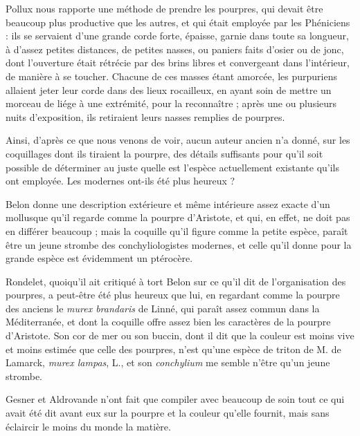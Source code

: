 \documentclass[a4paper, 11pt, oneside, polutonikogreek, french]{article}
\begin{document}
Pollux nous rapporte une méthode de prendre les pourpres, qui devait être beaucoup plus productive que les autres, et qui était employée par les Phéniciens : ils se servaient d'une grande corde forte, épaisse, garnie dans toute sa longueur, à d'assez petites distances, de petites nasses, ou paniers faits d'osier ou de jonc, dont l'ouverture était rétrécie par des brins libres et convergeant dans l'intérieur, de manière à se toucher. Chacune de ces masses étant amorcée, les purpuriens allaient jeter leur corde dans des lieux rocailleux, en ayant soin de mettre un morceau de liége à une extrémité, pour la reconnaître ; après une ou plusieurs nuits d'exposition, ils retiraient leurs nasses remplies de pourpres.

Ainsi, d'après ce que nous venons de voir, aucun auteur ancien n'a donné, sur les coquillages dont ils tiraient la pourpre, des détails suffisants pour qu'il soit possible de déterminer au juste quelle est l'espèce actuellement existante qu'ils ont employée. Les modernes ont-ils été plus heureux ?

Belon donne une description extérieure et même intérieure assez exacte d'un mollusque qu'il regarde comme la pourpre d'Aristote, et qui, en effet, ne doit pas en différer beaucoup ; mais la coquille qu'il figure comme la petite espèce, paraît être un jeune strombe des conchyliologistes modernes, et celle qu'il donne pour la grande espèce est évidemment un ptérocère.

Rondelet, quoiqu'il ait critiqué à tort Belon sur ce qu'il dit de l'organisation des pourpres, a peut-être été plus heureux que lui, en regardant comme la pourpre des anciens le \emph{murex brandaris} de Linné, qui paraît assez commun dans la Méditerranée, et dont la coquille offre assez bien les caractères de la pourpre d'Aristote. Son cor de mer ou son buccin, dont il dit que la couleur est moins vive et moins estimée que celle des pourpres, n'est qu'une espèce de triton de M. de Lamarck, \emph{murex lampas}, L., et son \emph{conchylium} me semble n'être qu'un jeune strombe.

Gesner et Aldrovande n'ont fait que compiler avec beaucoup de soin tout ce qui avait été dit avant eux sur la pourpre et la couleur qu'elle fournit, mais sans éclaircir le moins du monde la matière.
\end{document}
